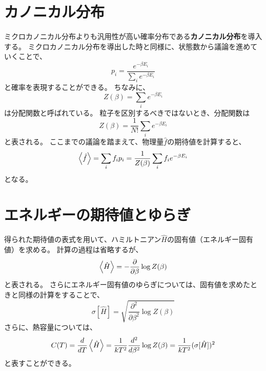 \documentclass[a4paper]{jsreport}
\begin{document}
        \section{カノニカル分布}
            ミクロカノニカル分布よりも汎用性が高い確率分布である\textbf{カノニカル分布}を導入する。
            ミクロカノニカル分布を導出した時と同様に、状態数から議論を進めていくことで、
            \begin{equation}
                p_i = \frac{e^{-\beta E_i}}{\sum\limits_{i} e^{-\beta E_i}}
            \end{equation}
            と確率を表現することができる。
            ちなみに、
            \begin{equation}
                Z(\beta) = \sum_{i} e^{-\beta E_i}
            \end{equation}
            は分配関数と呼ばれている。
            粒子を区別するべきではないとき、分配関数は
            \begin{equation}
                Z(\beta) = \frac{1}{N!} \sum_{i} e^{-\beta E_i}
            \end{equation}
            と表される。
            ここまでの議論を踏まえて、物理量$\hat{f}$の期待値を計算すると、
            \begin{equation}
                \ev{\hat{f}} = \sum_{i}f_ip_i = \frac{1}{Z(\beta)} \sum_{i}f_i e^{-\beta E_i}
            \end{equation}
            となる。

        \section{エネルギーの期待値とゆらぎ}
            得られた期待値の表式を用いて、ハミルトニアン$\hat{H}$の固有値（エネルギー固有値）を求める。
            計算の過程は省略するが、
            \begin{equation}
                \ev{\hat{H}} = -\frac{\partial}{\partial \beta} \log{Z(\beta)}
            \end{equation}
            と表される。
            さらにエネルギー固有値のゆらぎについては、固有値を求めたときと同様の計算をすることで、
            \begin{equation}
                \sigma[\hat{H}] = \sqrt{\frac{\partial^2}{\partial \beta ^2} \log{Z(\beta)}}
            \end{equation}
            さらに、熱容量については、
            \begin{equation}
                C(T) = \frac{d}{dT} \ev{\hat{H}} = \frac{1}{kT^2}\frac{d^2}{d \beta ^2}\log{Z(\beta)} = \frac{1}{kT^2}(\sigma[\hat{H}])^2
            \end{equation}
            と表すことができる。
\end{document}
